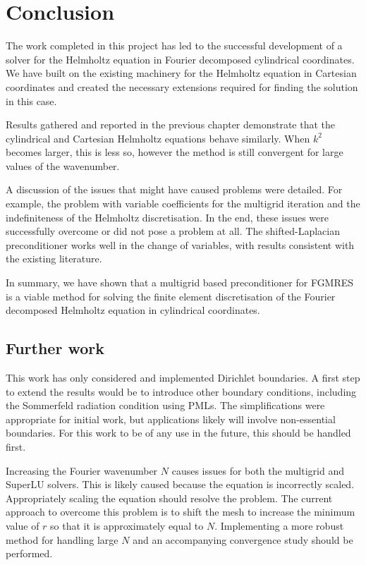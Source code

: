 \chapter{Conclusion}

The work completed in this project has led to the successful development of a solver for the Helmholtz equation in Fourier decomposed cylindrical coordinates.
We have built on the existing machinery for the Helmholtz equation in Cartesian coordinates and created the necessary extensions required for finding the solution in this case.

Results gathered and reported in the previous chapter demonstrate that the cylindrical and Cartesian Helmholtz equations behave similarly.
When $k^2$ becomes larger, this is less so, however the method is still convergent for large values of the wavenumber.

A discussion of the issues that might have caused problems were detailed.
For example, the problem with variable coefficients for the multigrid iteration and the indefiniteness of the Helmholtz discretisation.
In the end, these issues were successfully overcome or did not pose a problem at all.
The shifted-Laplacian preconditioner works well in the change of variables, with results consistent with the existing literature.

In summary, we have shown that a multigrid based preconditioner for FGMRES is a viable method for solving the finite element discretisation of the Fourier decomposed Helmholtz equation in cylindrical coordinates.






\section{Further work}

This work has only considered and implemented Dirichlet boundaries.
A first step to extend the results would be to introduce other boundary conditions, including the Sommerfeld radiation condition using PMLs.
The simplifications were appropriate for initial work, but applications likely will involve non-essential boundaries.
For this work to be of any use in the future, this should be handled first.

Increasing the Fourier wavenumber $N$ causes issues for both the multigrid and SuperLU solvers.
This is likely caused because the equation is incorrectly scaled.
Appropriately scaling the equation should resolve the problem.
The current approach to overcome this problem is to shift the mesh to increase the minimum value of $r$ so that it is approximately equal to $N$.
Implementing a more robust method for handling large $N$ and an accompanying convergence study should be performed.

